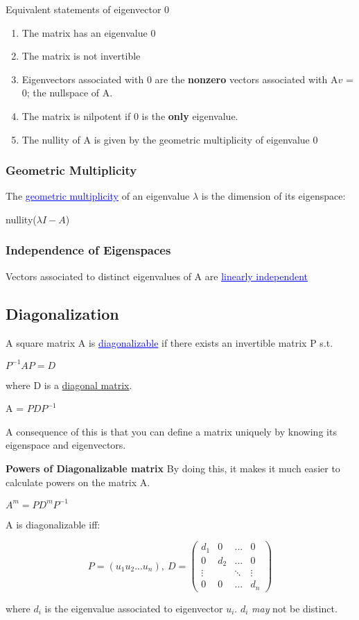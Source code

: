 \documentclass{article}
\newcommand{\bul}[1]{\textcolor{blue}{\underline{#1}}}
\newcommand{\sub}[1]{\vspace{10pt}\textbf{#1}}
\newcommand{\sbreak}{\vspace{10pt}}
\begin{document}
Equivalent statements of eigenvector 0
\begin{enumerate}
    \item The matrix has an eigenvalue 0
    \item The matrix is not invertible
    \item Eigenvectors associated with 0 are the \textbf{nonzero} vectors associated with A$v$ = 0; the nullspace of A.
    \item The matrix is nilpotent if 0 is the \textbf{only} eigenvalue.
    \item The nullity of A is given by the geometric multiplicity of eigenvalue 0
\end{enumerate}

\subsubsection{Geometric Multiplicity}
The \bul{geometric multiplicity} of an eigenvalue $\lambda$ is the dimension of its eigenspace:
\begin{center}
    nullity($\lambda I - A$)
\end{center}

\subsubsection{Independence of Eigenspaces}
Vectors associated to distinct eigenvalues of A are \bul{linearly independent}


\subsection{Diagonalization}
A square matrix A is \bul{diagonalizable} if there exists an invertible matrix P s.t.
\begin{center}
    $P^{-1}AP = D$
\end{center}
where D is a \underline{diagonal matrix}.
\begin{center}
    A = $PDP^{-1}$
\end{center}
A consequence of this is that you can define a matrix uniquely by knowing its eigenspace and eigenvectors.

\sub{Powers of Diagonalizable matrix}
By doing this, it makes it much easier to calculate powers on the matrix A.
\begin{center}
    $A^m = PD^mP^{-1}$
\end{center}

\sbreak
A is diagonalizable iff:
\begin{center}
    \[P = (u_1 u_2 ... u_n),\ D=\begin{pmatrix}
        d_1 & 0 & ... & 0\\
        0 & d_2 & ... & 0\\
        \vdots && \ddots & \vdots\\
        0 & 0 & ... & d_n
    \end{pmatrix}
    \]
\end{center}
where $d_i$ is the eigenvalue associated to eigenvector $u_i$. $d_i$ \textit{may} not be distinct. 
\end{document}
